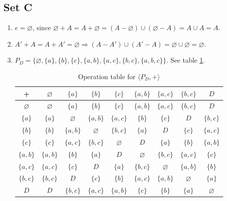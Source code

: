 \documentclass{article}
\let\emptyset\varnothing
\begin{document}
\subsection{Set C}
\begin{enumerate}
    \item $e = \emptyset$, since $\emptyset + A = A + \emptyset = (A - \emptyset) \cup (\emptyset - A) = A \cup A = A$.
    \item $A' + A = A + A' = \emptyset \Rightarrow (A - A') \cup (A'- A) = \emptyset \cup \emptyset = \emptyset$.
    \item $P_D = \{\emptyset, \{a\}, \{b\}, \{c\}, \{a, b\}, \{a, c\}, \{b, c\}, \{a, b, c\}\}$. See table \ref{tab:powerset-op}.
    \begin{table}[!ht]
        \centering
        \begin{tabular}{c|cccccccc}
        +             & $\emptyset$   & $\{a\}$       & $\{b\}$       & $\{c\}$       & $\{a, b\}$    & $\{a, c\}$    & $\{b, c\}$    & $D$ \\
        \hline
        $\emptyset$   & $\emptyset$   & $\{a\}$       & $\{b\}$       & $\{c\}$       & $\{a, b\}$    & $\{a, c\}$    & $\{b, c\}$    & $D$ \\
        $\{a\}$       & $\{a\}$       & $\emptyset$   & $\{a, b\}$    & $\{a, c\}$    & $\{b\}$       & $\{c\}$       & $D$           & $\{b, c\}$    \\
        $\{b\}$       & $\{b\}$       & $\{a, b\}$    & $\emptyset$   & $\{b, c\}$    & $\{a\}$       & $D$           & $\{c\}$       & $\{a, c\}$    \\
        $\{c\}$       & $\{c\}$       & $\{a, c\}$    & $\{b, c\}$    & $\emptyset$   & $D$           & $\{a\}$       & $\{b\}$       & $\{a, b\}$    \\
        $\{a, b\}$    & $\{a, b\}$    & $\{b\}$       & $\{a\}$       & $D$           & $\emptyset$   & $\{b, c\}$    & $\{a, c\}$    & $\{c\}$       \\
        $\{a, c\}$    & $\{a, c\}$    & $\{c\}$       & $D$           & $\{a\}$       & $\{b, c\}$    & $\emptyset$   & $\{a, b\}$    & $\{b\}$       \\
        $\{b, c\}$    & $\{b, c\}$    & $D$           & $\{c\}$       & $\{b\}$       & $\{a, c\}$    & $\{a, b\}$    & $\emptyset$   & $\{a\}$       \\
        $D$           & $D$           & $\{b, c\}$    & $\{a, c\}$    & $\{a, b\}$    & $\{c\}$       & $\{b\}$       & $\{a\}$       & $\emptyset$  
        \end{tabular}
        \caption{Operation table for $\langle P_D, + \rangle$}
        \label{tab:powerset-op}
    \end{table}
\end{enumerate}
\end{document}

